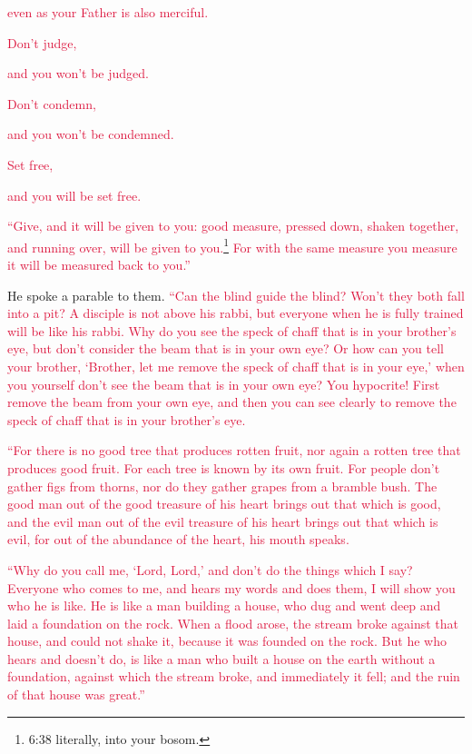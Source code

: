 \textcolor{crimson}{even as your Father is also merciful.}

\myverse{}\textcolor{crimson}{Don’t judge,}

\textcolor{crimson}{and you won’t be judged.}

\textcolor{crimson}{Don’t condemn,}

\textcolor{crimson}{and you won’t be condemned.}

\textcolor{crimson}{Set free,}

\textcolor{crimson}{and you will be set free.}

\myverse{}\textcolor{crimson}{“Give, and it will be given to you: good measure, pressed
	down, shaken together, and running over, will be given to you.}\footnote{6:38 literally, into your bosom.}
\textcolor{crimson}{For with the same measure you measure it will be measured back to you.”}

\myverse{}He spoke a parable to them.
\textcolor{crimson}{“Can the blind guide the blind? Won’t they both fall into a pit?
}
\myverse{}\textcolor{crimson}{A disciple is not above his rabbi, but everyone when he is fully trained
	will be like his rabbi.
}
\myverse{}\textcolor{crimson}{Why do you see the speck of chaff that is in your brother’s eye, but don’t
	consider the beam that is in your own eye?
}
\myverse{}\textcolor{crimson}{Or how can you tell your brother, ‘Brother, let me remove the speck of
	chaff that is in your eye,’ when you yourself don’t see the beam that is in your own eye? You hypocrite!
	First remove the beam from your own eye, and then you can see clearly to remove the speck of chaff that
	is in your brother’s eye.
}

\myverse{}\textcolor{crimson}{“For there is no good tree that produces rotten fruit, nor
	again a rotten tree that produces good fruit.
}
\myverse{}\textcolor{crimson}{For each tree is known by its own fruit. For people don’t gather figs
	from thorns, nor do they gather grapes from a bramble bush.
}
\myverse{}\textcolor{crimson}{The good man out of the good treasure of his heart brings out that which
	is good, and the evil man out of the evil treasure of his heart brings out that which is evil, for out
	of the abundance of the heart, his mouth speaks.}

\myverse{}\textcolor{crimson}{“Why do you call me, ‘Lord, Lord,’ and don’t do the things
	which I say?
}
\myverse{}\textcolor{crimson}{Everyone who comes to me, and hears my words and does them, I will show
	you who he is like.
}
\myverse{}\textcolor{crimson}{He is like a man building a house, who dug and went deep and laid a foundation
	on the rock. When a flood arose, the stream broke against that house, and could not shake it, because
	it was founded on the rock.
}
\myverse{}\textcolor{crimson}{But he who hears and doesn’t do, is like a man who built a house on the
	earth without a foundation, against which the stream broke, and immediately it fell; and the ruin of that
	house was great.”}


